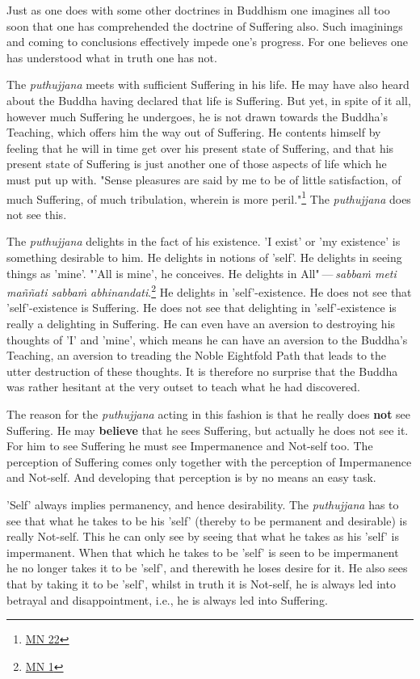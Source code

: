 Just as one does with some other doctrines in Buddhism one imagines all
too soon that one has comprehended the doctrine of Suffering also. Such
imaginings and coming to conclusions effectively impede one’s progress.
For one believes one has understood what in truth one has not.


The \emph{puthujjana} meets with sufficient Suffering in his life. He may
have also heard about the Buddha having declared that life is Suffering.
But yet, in spite of it all, however much Suffering he undergoes, he is
not drawn towards the Buddha’s Teaching, which offers him the way out of
Suffering. He contents himself by feeling that he will in time get over
his present state of Suffering, and that his present state of Suffering
is just another one of those aspects of life which he must put up with.
"Sense pleasures are said by me to be of little satisfaction, of much
Suffering, of much tribulation, wherein is more peril."\footnote{\href{https://suttacentral.net/mn22/en/bodhi}{MN 22}}
The \emph{puthujjana} does not see this.


The \emph{puthujjana} delights in the fact of his existence. 'I exist' or 'my
existence' is something desirable to him. He delights in notions of
'self'. He delights in seeing things as 'mine'. "'All is mine', he
conceives. He delights in All" — \emph{sabbaṁ meti maññati sabbaṁ
abhinandati}.\footnote{\href{https://suttacentral.net/mn1/en/bodhi}{MN 1}} He delights in 'self'-existence. He does
not see that 'self'-existence is Suffering. He does not see that
delighting in 'self'-existence is really a delighting in Suffering. He
can even have an aversion to destroying his thoughts of 'I' and 'mine',
which means he can have an aversion to the Buddha’s Teaching, an
aversion to treading the Noble Eightfold Path that leads to the utter
destruction of these thoughts. It is therefore no surprise that the
Buddha was rather hesitant at the very outset to teach what he had
discovered.


The reason for the \emph{puthujjana} acting in this fashion is that he really
does \textbf{not} see Suffering. He may \textbf{believe} that he sees Suffering, but
actually he does not see it. For him to see Suffering he must see
Impermanence and Not-self too. The perception of Suffering comes only
together with the perception of Impermanence and Not-self. And
developing that perception is by no means an easy task.


\label{impermanent}'Self' always implies permanency, and hence desirability. The
\emph{puthujjana} has to see that what he takes to be his 'self' (thereby to
be permanent and desirable) is really Not-self. This he can only see by
seeing that what he takes as his 'self' is impermanent. When that which
he takes to be 'self' is seen to be impermanent he no longer takes it to
be 'self', and therewith he loses desire for it. He also sees that by
taking it to be 'self', whilst in truth it is Not-self, he is always led
into betrayal and disappointment, i.e., he is always led into Suffering.


